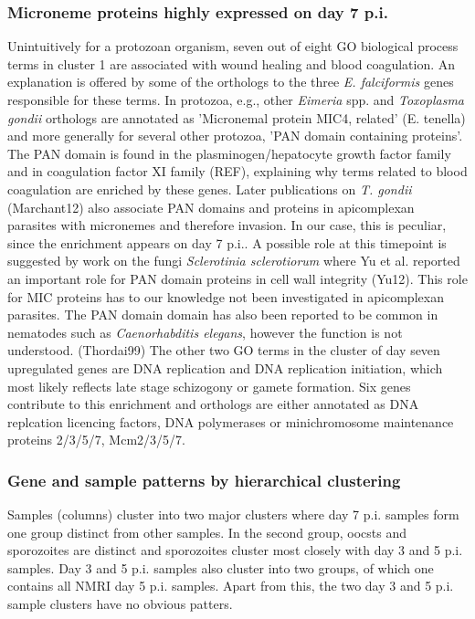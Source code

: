 \documentclass{bmcart}
\begin{document}
\subsubsection*{Microneme proteins highly expressed on day 7 p.i.}
Unintuitively for a protozoan organism, seven out of eight GO
biological process terms in cluster 1 are associated with wound
healing and blood coagulation.  An explanation is offered by some of
the orthologs to the three \textit{E. falciformis} genes responsible
for these terms. In protozoa, e.g., other \textit{Eimeria} spp. and
\textit{Toxoplasma gondii} orthologs are annotated as 'Micronemal
protein MIC4, related' (E. tenella) and more generally for several
other protozoa, 'PAN domain containing proteins'.  The PAN domain is
found in the plasminogen/hepatocyte growth factor family and in
coagulation factor XI family (REF), explaining why terms related to
blood coagulation are enriched by these genes.  Later publications on
\textit{T. gondii} (Marchant12) also associate PAN domains and
proteins in apicomplexan parasites with micronemes and therefore
invasion. In our case, this is peculiar, since the enrichment appears
on day 7 p.i.. A possible role at this timepoint is suggested by work
on the fungi \textit{Sclerotinia sclerotiorum} where Yu et
al. reported an important role for PAN domain proteins in cell wall
integrity (Yu12). This role for MIC proteins has to our knowledge not
been investigated in apicomplexan parasites.  The PAN domain domain
has also been reported to be common in nematodes such as
\textit{Caenorhabditis elegans}, however the function is not
understood. (Thordai99) The other two GO terms in the cluster of day
seven upregulated genes are DNA replication and DNA replication
initiation, which most likely reflects late stage schizogony or gamete
formation.  Six genes contribute to this enrichment and orthologs are
either annotated as DNA replcation licencing factors, DNA polymerases
or minichromosome maintenance proteins 2/3/5/7, Mcm2/3/5/7.


\subsubsection*{Gene and sample patterns by hierarchical clustering}
Samples (columns) cluster into two major clusters where day 7
p.i. samples form one group distinct from other samples. In the second
group, oocsts and sporozoites are distinct and sporozoites cluster
most closely with day 3 and 5 p.i. samples. Day 3 and 5 p.i. samples
also cluster into two groups, of which one contains all NMRI day 5
p.i. samples. Apart from this, the two day 3 and 5 p.i. sample
clusters have no obvious patters.
\end{document}
